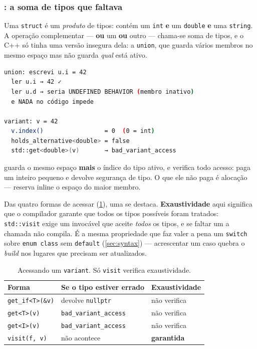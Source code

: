 \subsubsection{: a soma de tipos que faltava}

Uma \texttt{struct} é um \emph{produto} de tipos: contém um \texttt{int}
\textbf{e} um \texttt{double} \textbf{e} uma \texttt{string}. A operação
complementar --- \textbf{ou} um \textbf{ou} outro --- chama-se soma de tipos, e
o C++ só tinha uma versão insegura dela: a \texttt{union}, que guarda vários
membros no mesmo espaço mas não guarda \emph{qual} está ativo.

\begin{lstlisting}[style=bt, language=bash,
    caption={Saída de \texttt{src/vocabulary\_types/}: a \texttt{union} não sabe
             quem está ativo; o \texttt{variant} sabe.}]
union: escrevi u.i = 42
  ler u.i → 42 ✓
  ler u.d → seria UNDEFINED BEHAVIOR (membro inativo)
  e NADA no código impede

variant: v = 42
  v.index()                 = 0  (0 = int)
  holds_alternative<double> = false
  std::get<double>(v)       → bad_variant_access
\end{lstlisting}

 guarda o mesmo espaço \textbf{mais} o índice do tipo
ativo, e verifica todo acesso: paga um inteiro pequeno e devolve segurança de
tipo. O que ele não paga é alocação --- reserva inline o espaço do maior membro.

Das quatro formas de acessar (\cref{tab:variant-formas}), uma se destaca.
\textbf{Exaustividade} aqui significa que o compilador garante que todos os
tipos possíveis foram tratados: \texttt{std::visit} exige um invocável que
aceite \emph{todos} os tipos, e se faltar um a chamada não compila. É a mesma
propriedade que faz valer a pena um \texttt{switch} sobre \texttt{enum class}
sem \texttt{default} (\cref{sec:syntax}) --- acrescentar um caso quebra o
\emph{build} nos lugares que precisam ser atualizados.

\begin{table}[htbp]
\centering
\caption{Acessando um \texttt{variant}. Só \texttt{visit} verifica exaustividade.}
\label{tab:variant-formas}
\footnotesize
\begin{tabular}{@{}lll@{}}
\toprule
\textbf{Forma} & \textbf{Se o tipo estiver errado} & \textbf{Exaustividade} \\
\midrule
\texttt{get\_if<T>(\&v)} & devolve \texttt{nullptr}      & não verifica \\
\texttt{get<T>(v)}       & \texttt{bad\_variant\_access} & não verifica \\
\texttt{get<I>(v)}       & \texttt{bad\_variant\_access} & não verifica \\
\texttt{visit(f, v)}     & não acontece                  & \textbf{garantida} \\
\bottomrule
\end{tabular}
\end{table}

